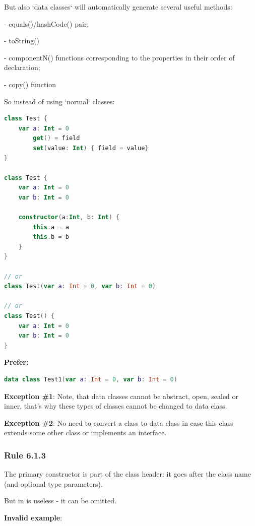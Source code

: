 {{{{But also `data classes` will automatically generate several useful methods:

- equals()/hashCode() pair;

- toString()

- componentN() functions corresponding to the properties in their order of declaration;

- copy() function



So instead of using `normal` classes:



\begin{lstlisting}[language=Kotlin]
class Test {
    var a: Int = 0
        get() = field
        set(value: Int) { field = value}
}

class Test {
    var a: Int = 0
    var b: Int = 0
    
    constructor(a:Int, b: Int) {
        this.a = a
        this.b = b
    }
}

// or
class Test(var a: Int = 0, var b: Int = 0)
 
// or
class Test() {
    var a: Int = 0
    var b: Int = 0
}
\end{lstlisting}


\textbf{Prefer:}

\begin{lstlisting}[language=Kotlin]
data class Test1(var a: Int = 0, var b: Int = 0)
\end{lstlisting}


\textbf{Exception \#1}: Note, that data classes cannot be abstract, open, sealed or inner, that's why these types of classes cannot be changed to data class.



\textbf{Exception \#2}: No need to convert a class to data class in case this class extends some other class or implements an interface.



\subsubsection*{\textbf{Rule 6.1.3}}
\leavevmode\newline

The primary constructor is part of the class header: it goes after the class name (and optional type parameters).

But in is useless - it can be omitted. 



\textbf{Invalid example}:

}}}}
